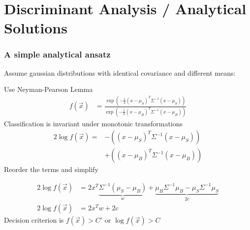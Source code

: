 \section[da]{Discriminant Analysis / Analytical Solutions}

\begin{frame}
        \frametitle{A simple analytical ansatz}
                \begin{overlayarea}{\textwidth}{0.3\textheight}
        Assume gaussian distributions with identical covariance and different means:
                \end{overlayarea}

        \begin{overlayarea}{\textwidth}{0.4\textheight}
         {
        Use Neyman-Pearson Lemma
         \begin{align*}
          f(\vec{x}) &= \frac{\exp\left( - \frac{1}{2} \left(x - \mu_S\right)^T \Sigma^{-1} \left(x - \mu_S\right)  \right) }{\exp\left( - \frac{1}{2} \left(x - \mu_B\right)^T \Sigma^{-1} \left(x - \mu_B\right)  \right)  }
         \end{align*}
        Classification is invariant under monotonic transformations
         }
         {
         \begin{align*}
     2 \log f(\vec{x}) = &- \left( \left(x - \mu_S\right)^T \Sigma^{-1} \left(x - \mu_S\right)  \right) \\
                    &+ \left( \left(x - \mu_B\right)^T \Sigma^{-1} \left(x - \mu_B\right)  \right)
         \end{align*}
        Reorder the terms and simplify
         }

         {
         \begin{align*}
     2 \log f(\vec{x}) &= 2 x^T \underbrace{ \Sigma^{-1} \left(\mu_S - \mu_B\right)}_{w} + \underbrace{\mu_B \Sigma^{-1} \mu_B - \mu_S \Sigma^{-1} \mu_S}_{2 c} \\
     2 \log f(\vec{x}) &= 2 x^T w + 2 c
         \end{align*}
    Decision criterion is $f(\vec{x}) > C'$ or $\log f(\vec{x}) > C$
        }
                 

\end{overlayarea}
\end{frame}
